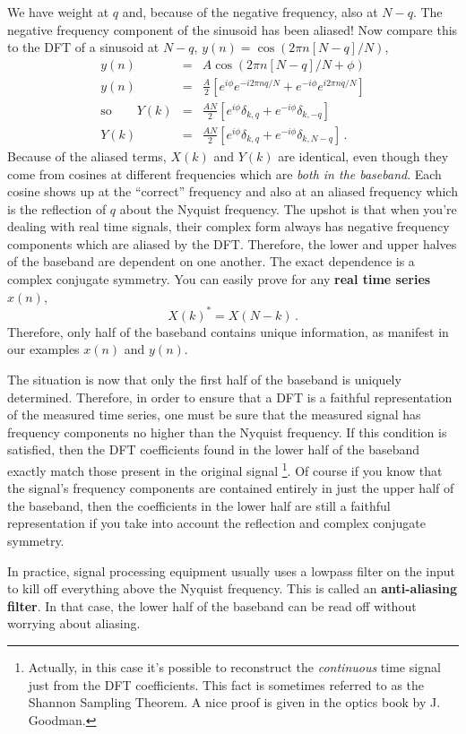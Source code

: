 We have weight at $q$ and, because of the negative frequency, also at $N-q$. The negative frequency component of the sinusoid has been aliased! Now compare this to the DFT of a sinusoid at $N-q$, $y(n)=\cos(2\pi n[N-q]/N)$,
\begin{eqnarray*}
  y(n) & = & A\cos\left(2\pi n[N-q]/N+\phi\right)\\
  y(n) & = & \frac{A}{2}\left[e^{i\phi}e^{-i2\pi nq/N}+e^{-i\phi}e^{i2\pi nq/N}\right]\\
  \text{so}\qquad Y(k) & = & \frac{AN}{2}\left[e^{i\phi}\delta_{k,q}+e^{-i\phi}\delta_{k,-q}\right]\\
  Y(k) & = & \frac{AN}{2}\left[e^{i\phi}\delta_{k,q}+e^{-i\phi}\delta_{k,N-q}\right]
  \, .
\end{eqnarray*}
Because of the aliased terms, $X(k)$ and $Y(k)$ are identical, even though they come from cosines at different frequencies which are \emph{both in the baseband}.
Each cosine shows up at the ``correct'' frequency and also at an aliased frequency which is the reflection of $q$ about the Nyquist frequency.
The upshot is that when you're dealing with real time signals, their complex form always has negative frequency components which are aliased by the DFT.
Therefore, the lower and upper halves of the baseband are dependent on one another.
The exact dependence is a complex conjugate symmetry. You can easily prove for any \textbf{real time series} $x(n)$,
\begin{equation}
  X(k)^* = X(N-k) \label{eq:conjugateSymmetry}
  \, .
\end{equation}
Therefore, only half of the baseband contains unique information, as manifest in our examples $x(n)$ and $y(n)$.

The situation is now that only the first half of the baseband is uniquely determined. Therefore, in order to ensure that a DFT is a faithful representation of the measured time series, one must be sure that the measured signal has frequency components no higher than the Nyquist frequency.
If this condition is satisfied, then the DFT coefficients found in the lower half of the baseband exactly match those present in the original signal \footnote{Actually, in this case it's possible to reconstruct the \emph{continuous} time signal just from the DFT coefficients.
This fact is sometimes referred to as the Shannon Sampling Theorem.
A nice proof is given in the optics book by J. Goodman.}.
Of course if you know that the signal's frequency components are contained entirely in just the upper half of the baseband, then the coefficients in the lower half are still a faithful representation if you take into account the reflection and complex conjugate symmetry.

In practice, signal processing equipment usually uses a lowpass filter on the input to kill off everything above the Nyquist frequency.
This is called an \textbf{anti-aliasing filter}.
In that case, the lower half of the baseband can be read off without worrying about aliasing.
